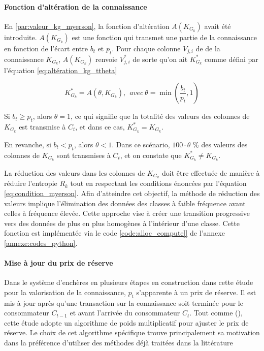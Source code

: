 \paragraph{Fonction d'altération de la connaissance\\} \label{par:alteration_func}

En \ref{par:valeur_kg_myerson}, la fonction d'altération $A(K_{G_k})$ avait été introduite. $A(K_{G_k})$ est une fonction qui transmet une partie de la connaissance en fonction de l'écart entre $b_t$ et $p_t$. Pour chaque colonne $V_{j,i}$ de de la connaissance $K_{G_k}$, $A(K_{G_k})$ renvoie $V_{j,i}^*$ de sorte qu'on ait $K_{G_k}^*$ comme défini par l'équation \ref{eq:altération_kg_ttheta} 

\begin{equation}
    K_{G_k}^* = A(\theta, K_{G_k}) ,\ \ avec \ \theta = \min(\frac{b_t}{p_t},1) \label{eq:altération_kg_ttheta}
\end{equation}

Si $b_t \geq p_t$, alors $\theta = 1$, ce qui signifie que la totalité des valeurs des colonnes de $K_{G_k}$ est transmise à $C_t$, et dans ce cas, $K_{G_k}^* = K_{G_k}$.

En revanche, si $b_t < p_t$, alors $\theta < 1$. Dans ce scénario, $100 \cdot \theta$ \% des valeurs des colonnes de $K_{G_k}$ sont transmises à $C_t$, et on constate que $K_{G_k}^* \neq K_{G_k}$.

La réduction des valeurs dans les colonnes de $K_{G_k}$ doit être effectuée de manière à réduire l'entropie $R_k$ tout en respectant les conditions énoncées par l'équation \ref{eq:condition_myerson}. Afin d'atteindre cet objectif, la méthode de réduction des valeurs implique l'élimination des données des classes à faible fréquence avant celles à fréquence élevée. Cette approche vise à créer une transition progressive vers des données de plus en plus homogènes à l'intérieur d'une classe. Cette fonction est implémentée via le code \autoref{code:alloc_compute]} de l'annexe \ref{annexe:codes_python}.

\paragraph{Mise à jour du prix de réserve\\} \label{par:prix_de_reserve_update}

Dans le système d'enchères en plusieurs étapes en construction dans cette étude pour la valorisation de la connaissance, $p_t$ s'apparente à un prix de réserve. Il est mis à jour après qu'une transaction sur la connaissance soit terminée  pour le consommateur $C_{t-1}$ et avant l'arrivée du consommateur $C_t$. Tout comme \citeauthor{agarwal_marketplace_2019}(\citeyear{agarwal_marketplace_2019}), cette étude adopte un algorithme de poids multiplicatif pour ajuster le prix de réserve. Le choix de cet algorithme spécifique trouve principalement sa motivation dans la préférence d'utiliser des méthodes déjà traitées dans la littérature

